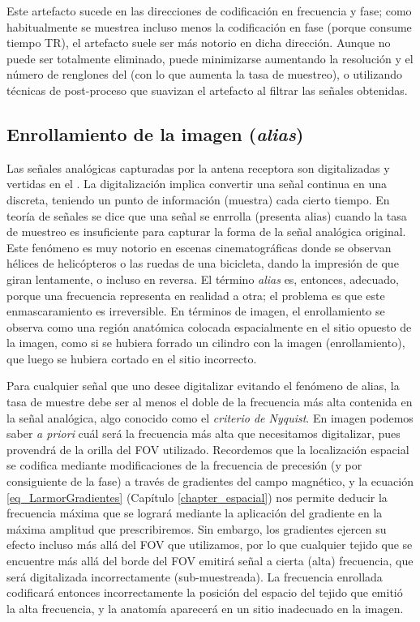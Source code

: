 Este artefacto sucede en las direcciones de codificación en frecuencia y fase; como habitualmente se muestrea incluso menos la codificación en fase (porque consume tiempo TR), el artefacto suele ser más notorio en dicha dirección. Aunque no puede ser totalmente eliminado, puede minimizarse aumentando la resolución y el número de renglones del \espaciok (con lo que aumenta la tasa de muestreo), o utilizando técnicas de post-proceso que suavizan el artefacto al filtrar las señales obtenidas. 

\subsection{Enrollamiento de la imagen (\textit{alias})}
Las señales analógicas capturadas por la antena receptora son digitalizadas y vertidas en el \espaciok. La digitalización implica convertir una señal continua en una discreta, teniendo un punto de información (muestra) cada cierto tiempo. En teoría de señales se dice que una señal se enrrolla (presenta alias) cuando la tasa de muestreo es insuficiente para capturar la forma de la señal analógica original. Este fenómeno es muy notorio en escenas cinematográficas donde se observan hélices de helicópteros o las ruedas de una bicicleta, dando la impresión de que giran lentamente, o incluso en reversa. El término \textit{alias} es, entonces, adecuado, porque una frecuencia representa en realidad a otra; el problema es que este enmascaramiento es irreversible.  En términos de imagen, el enrollamiento se observa como una región anatómica colocada espacialmente en el sitio opuesto de la imagen, como si se hubiera forrado un cilindro con la imagen (enrollamiento), que luego se hubiera cortado en el sitio incorrecto.

Para cualquier señal que uno desee digitalizar evitando el fenómeno de alias, la tasa de muestre debe ser al menos el doble de la frecuencia más alta contenida en la señal analógica, algo conocido como el \textit{criterio de Nyquist}. En imagen podemos saber \textit{a priori} cuál será la frecuencia más alta que necesitamos digitalizar, pues provendrá de la orilla del FOV utilizado. Recordemos que la localización espacial se codifica mediante modificaciones de la frecuencia de precesión (y por consiguiente de la fase) a través de gradientes del campo magnético, y la ecuación \ref{eq_LarmorGradientes} (Capítulo \ref{chapter_espacial}) nos permite deducir la frecuencia máxima que se logrará mediante la aplicación del gradiente en la máxima amplitud que prescribiremos. Sin embargo, los gradientes ejercen su efecto incluso más allá del FOV que utilizamos, por lo que cualquier tejido que se encuentre más allá del borde del FOV emitirá señal a cierta (alta) frecuencia, que será digitalizada incorrectamente (sub-muestreada). La frecuencia enrollada codificará entonces incorrectamente la posición del espacio del tejido que emitió la alta frecuencia, y la anatomía aparecerá en un sitio inadecuado en la imagen.

